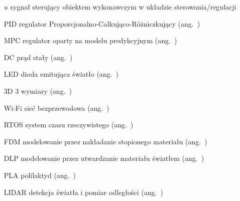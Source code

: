 \begin{itemize}
\item[$u$] sygnał sterujący obiektem wykonawczym w układzie sterowania/regulacji
\item[PID] regulator Proporcjonalno-Całkująco-Różniczkujący (ang.~)
\item[MPC] regulator oparty na modelu predykcyjnym (ang.~)
\item[DC] prąd stały (ang.~)
\item[LED] dioda emitująca światło (ang.~)
\item[3D] 3 wymiary (ang.~)
\item[Wi-Fi] sieć bezprzewodowa (ang.~)
\item[RTOS] system czasu rzeczywistego (ang.~)
\item[FDM] modelowanie przez nakładanie stopionego materiału (ang.~)
\item[DLP] modelowanie przez utwardzanie materiału światłem (ang.~)
\item[PLA] polilaktyd (ang.~)
\item[LIDAR] detekcja światła i pomiar odległości (ang.~)
\end{itemize}